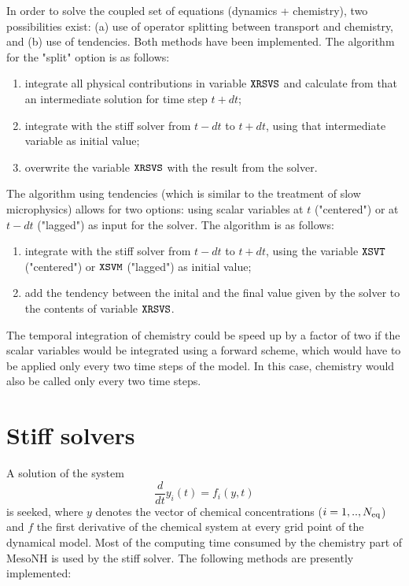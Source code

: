In order to solve the coupled set of equations (dynamics + chemistry), 
two possibilities exist: (a) use of operator splitting between transport
and chemistry, and (b) use of tendencies.
Both methods have been implemented.
The algorithm for the "split" option is as follows:
\begin{enumerate}
  \item integrate all physical contributions in variable $\tt XRSVS$
        and calculate from that an intermediate solution for time step $t+dt$;
  \item integrate with the stiff solver from $t-dt$ to $t+dt$,
        using that intermediate variable as initial value;
  \item overwrite the variable $\tt XRSVS$ with the result from the solver.
\end{enumerate}
The algorithm using tendencies 
(which is similar to the treatment of slow microphysics)
allows for two options: using scalar variables at $t$ ("centered") or
at $t-dt$ ("lagged") as input for the solver. The algorithm is as 
follows:
\begin{enumerate}
  \item integrate with the stiff solver from $t-dt$ to $t+dt$,
        using the variable $\tt XSVT$ ("centered") or $\tt XSVM$ ("lagged")
        as initial value;
  \item add the tendency between the inital and the final value
        given by the solver to the contents of variable $\tt XRSVS$.
\end{enumerate}
The temporal integration of chemistry could be speed up by a factor of two
if the scalar variables would be integrated using a forward scheme,
which would have to be applied only every two time steps of the model.
In this case, chemistry would also be called only every two time steps.
\section{Stiff solvers}
%
A solution of the system
\begin{equation}
  \frac{d}{dt} y_i(t) = f_i (y,t)
\end{equation}
is seeked,
where $y$ denotes the vector of chemical concentrations ($i=1,..,N_{\rm eq}$) and
$f$ the first derivative of the chemical system at every grid point of 
the dynamical  model.
Most of the computing time consumed by the chemistry part of MesoNH
is used by the stiff solver.
The following methods are presently implemented: 

